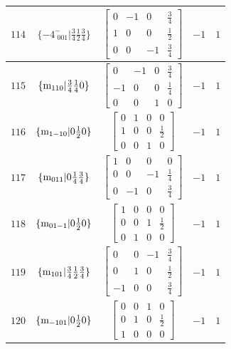 \documentclass[fleqn,8pt]{jsarticle}
\begin{document}
\begin{longtable}{ccccc}
$ 114 $ & $ \{-4^{-}_{\,\,001}|\frac{3}{4} \frac{1}{2} \frac{3}{4}\} $ & $ \begin{bmatrix} 0 & -1 & 0 & \frac{3}{4} \\ 1 & 0 & 0 & \frac{1}{2} \\ 0 & 0 & -1 & \frac{3}{4} \end{bmatrix} $ & $ -1 $ & $ 1 $ \\ \hline
$ 115 $ & $ \{{\rm m}_{110}|\frac{3}{4} \frac{1}{4} 0\} $ & $ \begin{bmatrix} 0 & -1 & 0 & \frac{3}{4} \\ -1 & 0 & 0 & \frac{1}{4} \\ 0 & 0 & 1 & 0 \end{bmatrix} $ & $ -1 $ & $ 1 $ \\ \hline
$ 116 $ & $ \{{\rm m}_{1-10}|0 \frac{1}{2} 0\} $ & $ \begin{bmatrix} 0 & 1 & 0 & 0 \\ 1 & 0 & 0 & \frac{1}{2} \\ 0 & 0 & 1 & 0 \end{bmatrix} $ & $ -1 $ & $ 1 $ \\ \hline
$ 117 $ & $ \{{\rm m}_{011}|0 \frac{1}{4} \frac{3}{4}\} $ & $ \begin{bmatrix} 1 & 0 & 0 & 0 \\ 0 & 0 & -1 & \frac{1}{4} \\ 0 & -1 & 0 & \frac{3}{4} \end{bmatrix} $ & $ -1 $ & $ 1 $ \\ \hline
$ 118 $ & $ \{{\rm m}_{01-1}|0 \frac{1}{2} 0\} $ & $ \begin{bmatrix} 1 & 0 & 0 & 0 \\ 0 & 0 & 1 & \frac{1}{2} \\ 0 & 1 & 0 & 0 \end{bmatrix} $ & $ -1 $ & $ 1 $ \\ \hline
$ 119 $ & $ \{{\rm m}_{101}|\frac{3}{4} \frac{1}{2} \frac{3}{4}\} $ & $ \begin{bmatrix} 0 & 0 & -1 & \frac{3}{4} \\ 0 & 1 & 0 & \frac{1}{2} \\ -1 & 0 & 0 & \frac{3}{4} \end{bmatrix} $ & $ -1 $ & $ 1 $ \\ \hline
$ 120 $ & $ \{{\rm m}_{-101}|0 \frac{1}{2} 0\} $ & $ \begin{bmatrix} 0 & 0 & 1 & 0 \\ 0 & 1 & 0 & \frac{1}{2} \\ 1 & 0 & 0 & 0 \end{bmatrix} $ & $ -1 $ & $ 1 $ \\ \hline

\end{longtable}
\end{document}
